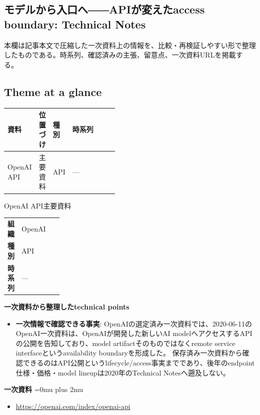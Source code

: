 \subsection*{モデルから入口へ――APIが変えたaccess boundary: Technical Notes}
本欄は記事本文で圧縮した一次資料上の情報を、比較・再検証しやすい形で整理したものである。時系列、確認済みの主張、留意点、一次資料URLを掲載する。
\smallskip
{}\par
\medskip
\subsection*{Theme at a glance}
\begin{center}
\footnotesize
\begin{tabularx}{\linewidth}{@{}p{0.20\linewidth}p{0.10\linewidth}p{0.14\linewidth}X@{}}
\toprule
資料 & 位置づけ & 種別 & 時系列 \\
\midrule
OpenAI API & 主要資料 & API & — \\
\bottomrule
\end{tabularx}
\end{center}
\normalsize

\begin{technicalnote}{OpenAI API}{主要資料}
\begingroup
\begin{tabularx}{\linewidth}{@{}>{\bfseries}p{0.22\linewidth}X@{}}
組織 & OpenAI \\
種別 & API \\
時系列 & — \\
\end{tabularx}
\smallskip
{\bfseries 一次資料から整理したtechnical points}
\begin{itemize}[leftmargin=1.5em,itemsep=0.35em]
\item \textbf{一次情報で確認できる事実}: OpenAIの選定済み一次資料では、2020-06-11のOpenAI一次資料は、OpenAIが開発した新しいAI modelへアクセスするAPIの公開を告知しており、model artifactそのものではなくremote service interfaceというavailability boundaryを形成した。 保存済み一次資料から確認できるのはAPI公開というlifecycle/access事実までであり、後年のendpoint仕様・価格・model lineupは2020年のTechnical Notesへ遡及しない。
\end{itemize}
\begin{minipage}{\linewidth}
\begin{samepage}
{\bfseries 一次資料}
\begingroup\sloppy
\Urlmuskip=0mu plus 2mu\relax
\begin{itemize}[leftmargin=1.5em,itemsep=0.25em]
\item {\scriptsize\url{https://openai.com/index/openai-api}}
\end{itemize}
\endgroup
\end{samepage}
\end{minipage}
\endgroup
\end{technicalnote}
\medskip
